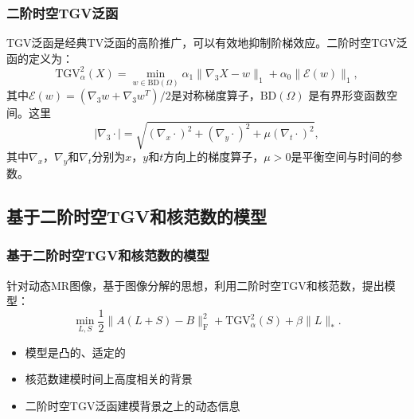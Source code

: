 \documentclass{beamer}
\begin{document}
%

\begin{frame}
\frametitle{二阶时空TGV泛函}
	TGV泛函是经典TV泛函的高阶推广，可以有效地抑制阶梯效应。二阶时空TGV泛函的定义为：
    $$\mathrm{TGV}_\alpha^2(X)=\min_{w\in \mathrm{BD}(\Omega)}\alpha_1\|\nabla_3 X-w\|_1 + \alpha_0\|\mathcal{E}(w)\|_1,$$
其中$\mathcal{E}(w)=(\nabla_3w+\nabla_3w^{T})/2$是对称梯度算子，$\mathrm{BD}(\Omega)$ 是有界形变函数空间。这里
$$|\nabla_3\cdot| = \sqrt{(\nabla_x\cdot)^2+(\nabla_y\cdot)^2+\mu(\nabla_t\cdot)^2},$$
其中$\nabla_x$，$\nabla_y$和$\nabla_t$分别为$x$，$y$和$t$方向上的梯度算子，$\mu>0$是平衡空间与时间的参数。
\end{frame}

\subsection{基于二阶时空TGV和核范数的模型}
\begin{frame}
	\frametitle{基于二阶时空TGV和核范数的模型}
针对动态MR图像，基于图像分解的思想，利用二阶时空TGV和核范数，提出模型：
\begin{equation}
\min_{L,S} \frac{1}{2}\|A(L+S)-B\|_{\mathrm{F}}^2+\mathrm{TGV}^2_\alpha(S)+\beta\|L\|_*.
\label{propopsed}
\end{equation}
\begin{itemize}
	\item 模型是凸的、适定的
	\item 核范数建模时间上高度相关的背景
	\item 二阶时空TGV泛函建模背景之上的动态信息
\end{itemize}
\end{frame}
\end{document}
